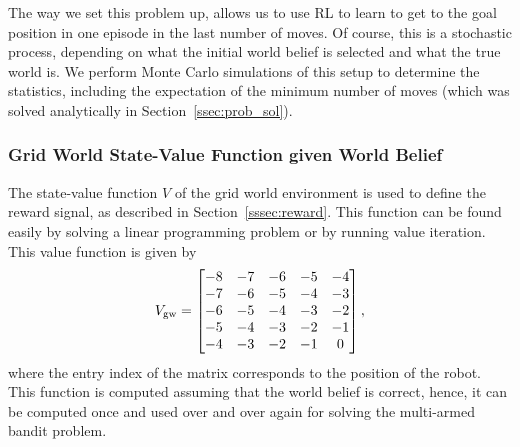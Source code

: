 The way we set this problem up, allows us to use RL to learn to get to the goal
position in one episode in the last number of moves. Of course, this is a
stochastic process, depending on what the initial world belief is selected and
what the true world is. We perform Monte Carlo simulations of this setup to determine the statistics, including the expectation of the minimum number of 
moves (which was solved analytically in Section~\ref{ssec:prob_sol}).


\subsubsection{Grid World State-Value Function given World Belief}
%
The state-value function $V$ of the grid world environment is used to define the
reward signal, as described in Section~\ref{sssec:reward}. This function can be
found easily by solving a linear programming problem or by running value
iteration. This value function is given by 
%
\[
V_{\text{gw}} = \begin{bmatrix}
    -8 & -7 & -6 & -5 & -4 \\
    -7 & -6 & -5 & -4 & -3 \\
    -6 & -5 & -4 & -3 & -2 \\
    -5 & -4 & -3 & -2 & -1 \\
    -4 & -3 & -2 & -1 &  0    
\end{bmatrix},
\]
%
where the entry index of the matrix corresponds to the position of the robot.
This function is computed assuming that the world belief is correct, hence, it
can be computed once and used over and over again for solving the multi-armed
bandit problem.